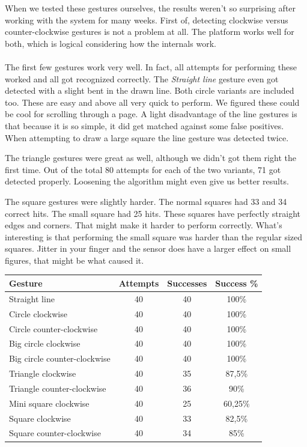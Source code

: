 \documentclass[a4paper]{article}
\begin{document}
  When we tested these gestures ourselves, the results weren't so surprising
  after working with the system for many weeks. First of, detecting clockwise
  versus counter-clockwise gestures is not a problem at all. The platform works
  well for both, which is logical considering how the internals work.

  \paragraph{}
  The first few gestures work very well. In fact, all attempts for performing
  these worked and all got recognized correctly. The \emph{Straight line}
  gesture even got detected with a slight bent in the drawn line. Both circle
  variants are included too. These are easy and above all very quick to perform.
  We figured these could be cool for scrolling through a page.
  A light disadvantage of the line gestures is that because it is so simple, it
  did get matched against some false positives. When attempting to draw a large
  square the line gesture was detected twice.

  The triangle gestures were great as well, although we didn't got them right
  the first time. Out of the total 80 attempts for each of the two variants, 71
  got detected properly. Loosening the algorithm might even give us better
  results.

  The square gestures were slightly harder. The normal squares had 33 and 34
  correct hits. The small square had 25 hits. These squares have perfectly
  straight edges and corners. That might make it harder to perform correctly.
  What's interesting is that performing the small square was harder than the
  regular sized squares. Jitter in your finger and the sensor does have a larger
  effect on small figures, that might be what caused it.

  \begin{center}
    \begin{tabular}{ |l|c|c|c| }
      \hline
      \textbf{Gesture} & \textbf{Attempts} &
      \textbf{Successes} & \textbf{Success \%} \\
      \hline
      Straight line & 40 & 40 & 100\% \\
      \hline
      Circle clockwise & 40 & 40 & 100\% \\
      \hline
      Circle counter-clockwise & 40 & 40 & 100\% \\
      \hline
      Big circle clockwise & 40 & 40 & 100\% \\
      \hline
      Big circle counter-clockwise & 40 & 40 & 100\% \\
      \hline
      Triangle clockwise & 40 & 35 & 87,5\% \\
      \hline
      Triangle counter-clockwise & 40 & 36 & 90\% \\
      \hline
      Mini square clockwise & 40 & 25 & 60,25\% \\
      \hline
      Square clockwise & 40 & 33 & 82,5\% \\
      \hline
      Square counter-clockwise & 40 & 34 & 85\% \\
      \hline
    \end{tabular}
  \end{center}
\end{document}
